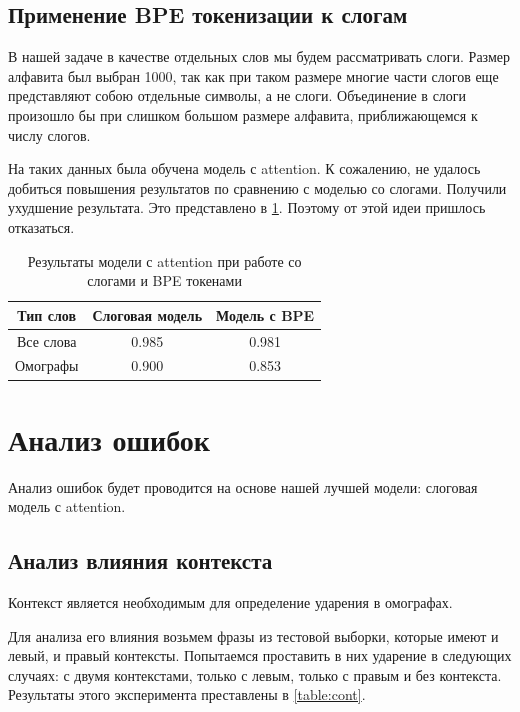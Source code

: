 \documentclass[14pt, a4paper, russian]{extreport}
\begin{document}
\subsection{Применение BPE токенизации к слогам}
В нашей задаче в качестве отдельных слов мы будем рассматривать слоги. Размер алфавита был выбран 1000, так как при таком размере многие части слогов еще представляют собою отдельные символы, а  не слоги. Объединение в слоги произошло бы при слишком большом размере алфавита, приближающемся к числу слогов.

На таких данных была обучена модель с attention. К сожалению, не удалось добиться повышения результатов по сравнению с моделью со слогами. Получили ухудшение результата. Это представлено в \cref{table:bpe}. Поэтому от этой идеи пришлось отказаться.


\begin{table}[H]
	\caption{Результаты модели с attention при работе со слогами и BPE токенами}
	
	\begin{small}
		\begin{center}
			\begin{tabular}{|c | c | c|}
				\hline
				Тип слов  & Слоговая модель & Модель с BPE \\ \hline
				Все слова & 0.985           & 0.981        \\ \hline
				Омографы  & 0.900           & 0.853        \\ \hline
			\end{tabular}
		\end{center}
	\end{small}
	\label{table:bpe}
\end{table}




\section{Анализ ошибок}
Анализ ошибок будет проводится на основе нашей лучшей модели: слоговая модель с attention.
\subsection{Анализ влияния контекста}
Контекст является необходимым для определение ударения в омографах. 

Для анализа его влияния возьмем фразы из тестовой выборки, которые имеют и  левый, и правый контексты. Попытаемся проставить в них ударение в следующих случаях: с двумя контекстами, только с левым, только с правым и без контекста. Результаты этого эксперимента преставлены в \cref{table:cont}.
\end{document}
